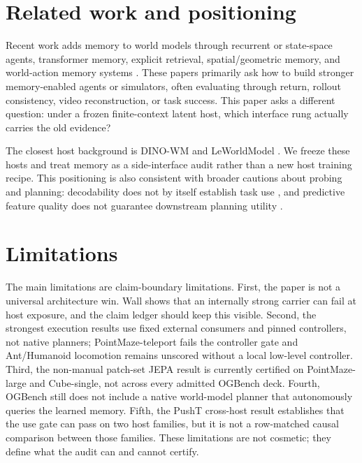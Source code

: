 \section{Related work and positioning}

Recent work adds memory to world models through recurrent or state-space
agents, transformer memory, explicit retrieval, spatial/geometric memory, and
world-action memory systems
\citep{r_r2i,r_onmemory,r_s4wm,r_memworld,r_memorywam,r_dimwam,r_persist,
r_statecore}.  These papers primarily ask how to build stronger memory-enabled
agents or simulators, often evaluating through return, rollout consistency,
video reconstruction, or task success.  This paper asks a different question:
under a frozen finite-context latent host, which interface rung actually
carries the old evidence?

The closest host background is DINO-WM \citep{r_dinowm} and LeWorldModel
\citep{r_lewm}.  We freeze these hosts and treat memory as a side-interface
audit rather than a new host training recipe.  This positioning is also
consistent with broader cautions about probing and planning: decodability does
not by itself establish task use \citep{r_belinkov,r_ravich}, and predictive
feature quality does not guarantee downstream planning utility \citep{r_rcaux}.

\section{Limitations}

The main limitations are claim-boundary limitations.  First, the paper is not
a universal architecture win.  Wall shows that an internally strong carrier can
fail at host exposure, and the claim ledger should keep this visible.  Second,
the strongest execution results use fixed external consumers and pinned
controllers, not native planners; PointMaze-teleport fails the controller gate
and Ant/Humanoid locomotion remains unscored without a local low-level
controller.  Third, the non-manual patch-set JEPA result is currently certified
on PointMaze-large and Cube-single, not across every admitted OGBench deck.
Fourth, OGBench still does not include a native world-model planner that
autonomously queries the learned memory.  Fifth, the PushT cross-host result establishes that the use gate can pass on
two host families, but it is not a row-matched causal comparison between those
families.  These limitations are not cosmetic; they define what the audit can
and cannot certify.

